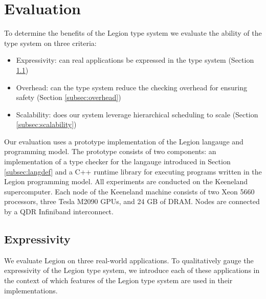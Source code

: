 
\section{Evaluation}
\label{sec:evaluation}

To determine the benefits of the Legion type system we evaluate
the ability of the type system on three criteria:
\begin{itemize}
\item Expressivity: can real applications be expressed in the type system (Section \ref{subsec:expressivity})
\item Overhead: can the type system reduce the checking overhead for ensuring safety (Section \ref{subsec:overhead})
\item Scalability: does our system leverage hierarchical scheduling to scale (Section \ref{subsec:scalability})
\end{itemize}
Our evaluation uses a prototype implementation of the Legion langauge and programming model.
The prototype consists of two components: an implementation of a type checker
for the langauge introduced in Section \ref{subsec:langdef} and a C++ runtime library
for executing programs written in the Legion programming model\cite{Legion12}.  All experiments
are conducted on the Keeneland supercomputer\cite{Keeneland}.  Each node of the Keeneland
machine consists of two Xeon 5660 processors, three Tesla M2090 GPUs, and 24 GB of DRAM.  Nodes
are connected by a QDR Infiniband interconnect.

\subsection{Expressivity}
\label{subsec:expressivity}
We evaluate Legion on three real-world applications.  To qualitatively gauge the 
expressivity of the Legion type system, we introduce each of these applications in
the context of which features of the Legion type system are used in their implementations.

